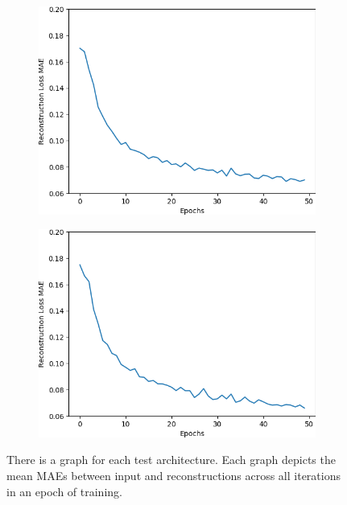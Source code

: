 \begin{figure}[H]
    \begin{subfigure}{.25\textwidth}
        \centering
        \includegraphics[width=\textwidth]
        {images/figures/experiments_architecture/mae_graphKernel3adjusted8x8x64_dim1024.png}
        \caption{}
    \end{subfigure}%
    \begin{subfigure}{.25\textwidth}
        \centering
        \includegraphics[width=\textwidth]
        {images/figures/experiments_architecture/mae_graphKernel3adjusted16x16x32_dim1024.png}
        \caption{}
    \end{subfigure}
    \caption{There is a graph for each test architecture.
    Each graph depicts the mean MAEs between input and reconstructions across all iterations in an epoch of training.}
\end{figure} \label{figure_learning_curves_1}

